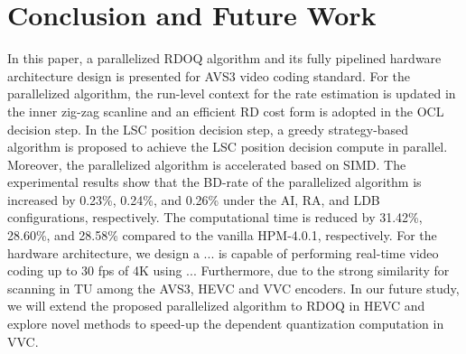 \documentclass[lettersize,journal]{IEEEtran}
\begin{document}
\section{Conclusion and Future Work}
\label{sec:6}
In this paper, a parallelized RDOQ algorithm and its fully pipelined hardware architecture design is presented for AVS3 video coding standard. For the parallelized algorithm, the run-level context for the rate estimation is updated in the inner zig-zag scanline and an efficient RD cost form is adopted in the OCL decision step. In the LSC position decision step, a greedy strategy-based algorithm is proposed to achieve the LSC position decision compute in parallel. Moreover, the parallelized algorithm is accelerated based on SIMD. The experimental results show that the BD-rate of the parallelized algorithm is increased by 0.23\%, 0.24\%, and 0.26\% under the AI, RA, and LDB configurations, respectively. The computational time is reduced by 31.42\%, 28.60\%, and 28.58\% compared to the vanilla HPM-4.0.1, respectively. 
For the hardware architecture, we design a ... is capable of performing real-time video coding up to 30 fps of 4K using ... Furthermore, due to the strong similarity for scanning in TU among the AVS3, HEVC and VVC encoders. 
In our future study, we will extend the proposed parallelized algorithm to RDOQ in HEVC and explore novel methods to speed-up the dependent quantization computation in VVC. 






\end{document}

